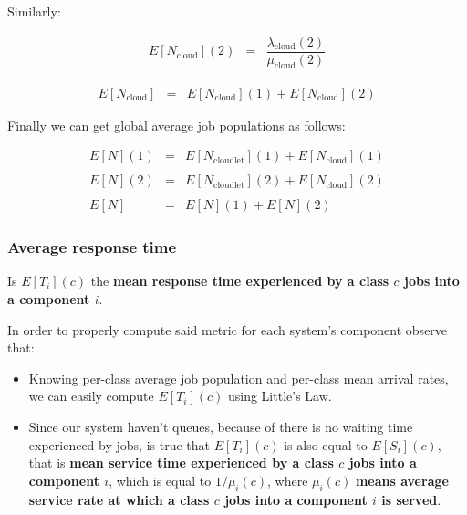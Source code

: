 \documentclass[10pt,a4paper]{article}
\begin{document}
Similarly:
 
\begin{equation}
\label{eq:cloudAveragePopulation2}
\begin{array} {rcl} 
E[N_{\text{cloud}}](2) & = & \dfrac{\lambda_{\text{cloud}}(2)}{\mu_{\text{cloud}}(2)}
\end{array}
\end{equation}

\begin{equation}
\label{eq:cloudAveragePopulation3}
\begin{array} {rcl} 
E[N_{\text{cloud}}] & = & E[N_{\text{cloud}}](1) + E[N_{\text{cloud}}](2)
\end{array}
\end{equation}

Finally we can get global average job populations as follows:

\begin{equation}
\label{eq:AveragePopulation}
\begin{array} {rcl} 

E[N](1) & = & E[N_{\text{cloudlet}}](1) + E[N_{\text{cloud}}](1) \\\\

E[N](2) & = & E[N_{\text{cloudlet}}](2) + E[N_{\text{cloud}}](2) \\\\

E[N] & = & E[N](1) + E[N](2) 

\end{array}
\end{equation}


\subsubsection{Average response time}

Is $E[T_i](c)$ the \textbf{mean response time experienced by a class $c$ jobs into a component $i$}. 

In order to properly compute said metric for each system's component observe that:
\begin{itemize}
\item Knowing per-class average job population and per-class mean arrival rates, we can easily compute $E[T_i](c)$ using Little’s Law.
\item Since our system haven't queues, because of there is no waiting time experienced by jobs, is true that $E[T_i](c)$ is also equal to $E[S_i](c)$, that is \textbf{mean service time experienced by a class $c$ jobs into a component $i$}, which is equal to $1/\mu_i(c)$, where $\mu_i(c)$ \textbf{means average service rate at which a class $c$ jobs into a component $i$ is served}.
\end{itemize}
\end{document}
